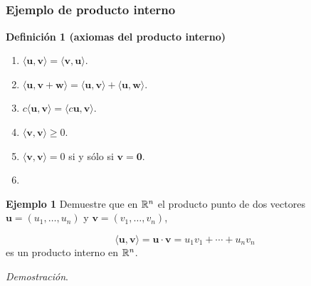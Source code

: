 
\subsection{}

\begin{frame}\frametitle{Ejemplo de producto interno}

\begin{block}{\textbf{Definición 1 (axiomas del producto interno)}}	
	\begin{multicols}{2}		
		\begin{enumerate}			
			\justifying
			\item[\labelname{$a$}] $\langle \mathbf{u}, \mathbf{v}\rangle = \langle \mathbf{v}, \mathbf{u}\rangle$. \\%
			\item[\labelname{$b$}] $\langle \mathbf{u}, \mathbf{v}+\mathbf{w}\rangle 
			= \langle \mathbf{u}, \mathbf{v}\rangle + \langle \mathbf{u}, \mathbf{w}\rangle$. \\%
			\item[\labelname{$c$}] $c\langle \mathbf{u}, \mathbf{v}\rangle = \langle c\mathbf{u}, \mathbf{v}\rangle$.\\
			\columnbreak
			\item[\labelname{$d$}] $\langle \mathbf{v}, \mathbf{v}\rangle \geq 0 $. 
			\item[\labelname{$e$}] $\langle \mathbf{v}, \mathbf{v}\rangle = 0 $ si y sólo si $\mathbf{v}=\mathbf{0}$. 
			\item[]
		\end{enumerate}		
	\end{multicols}
	
\end{block}

\begin{ej}{\textbf{Ejemplo 1}}\justifying
	Demuestre que en $\mathbb{R}^n$ el producto punto de dos vectores $\mathbf{u}=(u_1,\hdots,u_n)$ y 
	$\mathbf{v}=(v_1,\hdots,v_n)$,
	
	\vspace{-4mm}
	\[
		\langle \mathbf{u}, \mathbf{v}\rangle = \mathbf{u}\cdot \mathbf{v} = u_1v_1 + \cdots + u_nv_n
	\]
	es un producto interno en $\mathbb{R}^n$.
\end{ej}
\textit{Demostración}.

\end{frame}

